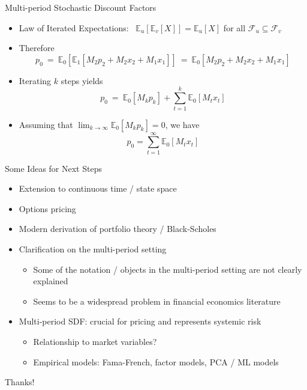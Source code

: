 \documentclass[aspectratio=1610]{beamer}
\newcommand{\eq}{\ =\ }
\newcommand{\bb}{\mathbb}
\newcommand{\mc}{\mathcal}
\begin{document}
\begin{frame}{Multi-period Stochastic Discount Factors}
  \begin{itemize}
    \item Law of Iterated Expectations: \ $\bb E_u\left[\bb E_v[X]\right] = \bb E_u[X]$ for all $\mc F_u \subseteq \mc F_v$
    \item Therefore
    \begin{equation}
      p_0
      \eq \bb E_0\left[\bb E_1 \left[M_2p_2+M_2x_2+M_1x_1\right]\right]
      \eq \bb E_0\left[M_2p_2+M_2x_2+M_1x_1\right]
    \end{equation}
    \item Iterating $k$ steps yields
    \begin{equation}
      p_0 \eq \bb E_0[M_k p_k] + \sum_{t=1}^k \bb E_0[M_tx_t]
    \end{equation}
    \item Assuming that $\lim_{k\rightarrow\infty}\bb E_0[M_kp_k] = 0$, we have
    $$p_0 = \sum_{t=1}^\infty \bb E_0[M_tx_t]$$
  \end{itemize}
\end{frame}

\begin{frame}{Some Ideas for Next Steps}
\begin{itemize}
  \item Extension to continuous time / state space
  \item Options pricing
  \item Modern derivation of portfolio theory / Black-Scholes
  \item Clarification on the multi-period setting
  \begin{itemize}
    \item Some of the notation / objects in the multi-period setting are not clearly explained
    \item Seems to be a widespread problem in financial economics literature
  \end{itemize}
  \item Multi-period SDF: crucial for pricing and represents systemic risk
  \begin{itemize}
    \item Relationship to market variables?
    \item Empirical models: Fama-French, factor models, PCA / ML models
  \end{itemize}
\end{itemize}
\end{frame}

\begin{frame}
\huge{Thanks!}
\end{frame}
\end{document}
